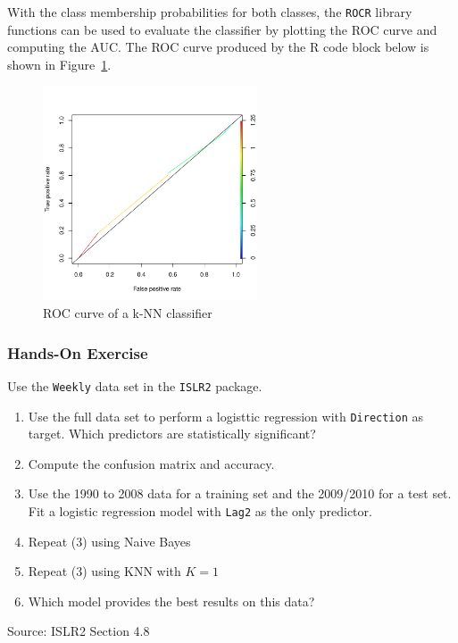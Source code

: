With the class membership probabilities for both classes, the \texttt{ROCR} library functions can be used to evaluate the classifier by plotting the ROC curve and computing the AUC. The ROC curve produced by the R code block below is shown in Figure~\ref{fig:knnroc}.

\begin{samepage}
\end{samepage}

\begin{figure}
\centering
\includegraphics[height=2.5in]{knn_roc.pdf}
\caption{ROC curve of a k-NN classifier}
\label{fig:knnroc}
\end{figure}


\begin{tcolorbox}[colback=code]
\subsubsection*{Hands-On Exercise} 

Use the \texttt{Weekly} data set in the \texttt{ISLR2} package.
\begin{enumerate}
   \item Use the full data set to perform a logisttic regression with \texttt{Direction} as target. Which predictors are statistically significant?
   \item Compute the confusion matrix and accuracy.
   \item Use the 1990 to 2008 data for a training set and the 2009/2010 for a test set. Fit a logistic regression model with \texttt{Lag2} as the only predictor.
   \item Repeat (3) using Naive Bayes
   \item Repeat (3) using KNN with $K=1$
   \item Which model provides the best results on this data?
\end{enumerate}
{\footnotesize \vspace{\baselineskip} Source: ISLR2 Section 4.8}
\end{tcolorbox}

